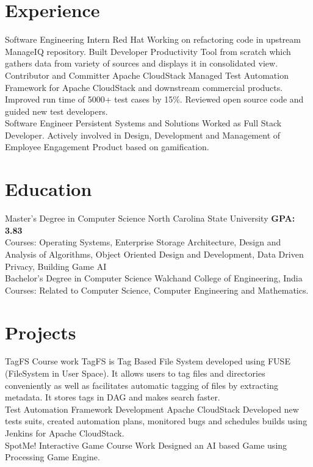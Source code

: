 \documentclass[]{friggeri-cv}
\begin{document}
\section{Experience}
\begin{entrylist}
  \entry
    {Software Engineering Intern}
    {Red Hat}
    {Working on refactoring code in upstream ManageIQ repository. Built Developer Productivity Tool from scratch which gathers data from variety of sources and displays it in consolidated view.\newline}
  \entry
    {Contributor and Committer}
    {Apache CloudStack}
    {Managed Test Automation Framework for Apache CloudStack and downstream commercial products. Improved run time of 5000+ test cases by 15\%. Reviewed open source code and guided new test developers.\\}
    \entry
    {Software Engineer}
    {Persistent Systems and Solutions}
    {Worked as Full Stack Developer. Actively involved in Design, Development and Management of Employee Engagement Product based on gamification.\\}
\end{entrylist}
\section{Education}
\begin{entrylist}
  \entry
    {Master's Degree in Computer Science}
    {North Carolina State University}
    {\textbf{GPA: 3.83}\\Courses: Operating Systems, Enterprise Storage Architecture, Design and Analysis of Algorithms, Object Oriented Design and Development, Data Driven Privacy, Building Game AI\\}
  \entry
    {Bachelor's Degree in Computer Science}
    {Walchand College of Engineering, India}
    {Courses: Related to Computer Science, Computer Engineering and Mathematics.\\}
\end{entrylist}


\section{Projects}
\begin{entrylist}
  \entry
    {TagFS}
    {Course work}
    {TagFS is Tag Based File System developed using FUSE (FileSystem in User Space). It allows users to tag files and directories conveniently as well as facilitates automatic tagging of files by extracting metadata. It stores tags in DAG and makes search faster.\\}
    \entry
    {Test Automation Framework Development}
    {Apache CloudStack}
    {Developed new tests suits, created automation plans, monitored bugs and schedules builds using Jenkins for Apache CloudStack.\\}
    \entry
    {SpotMe! Interactive Game}
    {Course Work}
    {Designed an AI based Game using Processing Game Engine.\\}
\end{entrylist}
\end{document}
